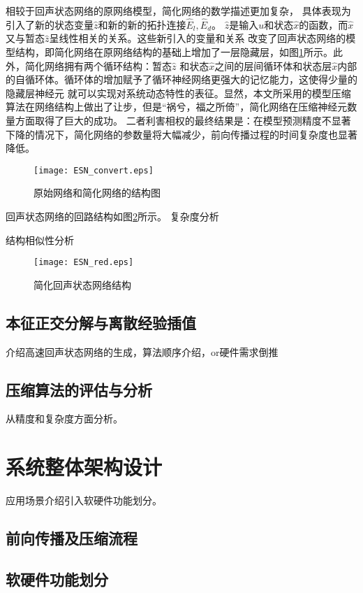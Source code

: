 相较于回声状态网络的原网络模型，简化网络的数学描述更加复杂， 具体表现为引入了新的状态变量\(\widehat{z}\)和新的新的拓扑连接\(\widehat{E}_l,\widehat{E}_d\)。
\(\widehat{z}\)是输入\(u\)和状态\(\widehat{x}\)的函数，而\(\widehat{x}\)又与暂态\(\widehat{z}\)呈线性相关的关系。这些新引入的变量和关系
改变了回声状态网络的模型结构，即简化网络在原网络结构的基础上增加了一层隐藏层，如图\ref{fig:esn_convert}所示。此外，简化网络拥有两个循环结构：暂态\(\widehat{z}\)
和状态\(\widehat{x}\)之间的层间循环体和状态层\(\widehat{x}\)内部的自循环体。循环体的增加赋予了循环神经网络更强大的记忆能力，这使得少量的隐藏层神经元
就可以实现对系统动态特性的表征。显然，本文所采用的模型压缩算法在网络结构上做出了让步，但是“祸兮，福之所倚”，简化网络在压缩神经元数量方面取得了巨大的成功。
二者利害相权的最终结果是：在模型预测精度不显著下降的情况下，简化网络的参数量将大幅减少，前向传播过程的时间复杂度也显著降低。
\begin{figure}
	\centering
	\texttt{[image: ESN\_convert.eps]}
	\caption{原始网络和简化网络的结构图}
	\label{fig:esn_convert}
\end{figure}

回声状态网络的回路结构如图\ref{fig:esn_red}所示。
复杂度分析

结构相似性分析

\begin{figure}
	\centering
	\texttt{[image: ESN\_red.eps]}
	\caption{简化回声状态网络结构}
	\label{fig:esn_red}
\end{figure}

\subsection{本征正交分解与离散经验插值}
介绍高速回声状态网络的生成，算法顺序介绍，or硬件需求倒推
\subsection{压缩算法的评估与分析}
从精度和复杂度方面分析。

\section{系统整体架构设计}
应用场景介绍引入软硬件功能划分。
\subsection{前向传播及压缩流程}
\subsection{软硬件功能划分}
